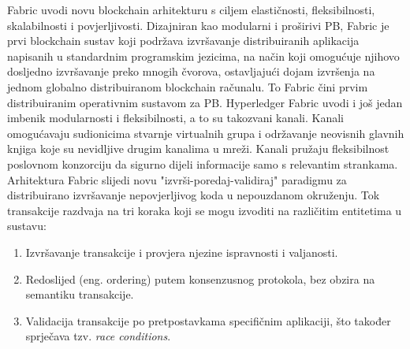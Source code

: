 \documentclass[times, utf8, diplomski]{fer}
\begin{document}
Fabric uvodi novu blockchain arhitekturu s ciljem elastičnosti, fleksibilnosti, skalabilnosti i povjerljivosti. Dizajniran kao modularni i proširivi PB, Fabric je prvi blockchain sustav koji podržava izvršavanje distribuiranih aplikacija napisanih u standardnim programskim jezicima, na način koji omogućuje njihovo dosljedno izvršavanje preko mnogih čvorova, ostavljajući dojam izvršenja na jednom globalno distribuiranom blockchain
računalu. To Fabric čini prvim distribuiranim operativnim sustavom za PB.
Hyperledger Fabric uvodi i još jedan imbenik modularnosti i fleksibilnosti, a to su takozvani kanali. Kanali omogućavaju sudionicima stvarnje virtualnih grupa i održavanje neovisnih glavnih knjiga koje su nevidljive drugim kanalima u mreži. Kanali pružaju fleksibilnost poslovnom konzorciju da sigurno dijeli informacije samo s relevantim strankama.
Arhitektura Fabric slijedi novu "izvrši-poredaj-validiraj" paradigmu za distribuirano izvršavanje nepovjerljivog koda u nepouzdanom okruženju. Tok transakcije razdvaja na tri koraka koji se mogu izvoditi na različitim entitetima u sustavu:

\begin{enumerate}

\item Izvršavanje transakcije i provjera njezine ispravnosti i valjanosti.

\item Redoslijed (eng. ordering) putem konsenzusnog protokola, bez obzira na semantiku transakcije.

\item Validacija transakcije po pretpostavkama specifičnim aplikaciji, što također sprječava tzv.  \textit{race conditions}.

\end{enumerate}
\end{document}
